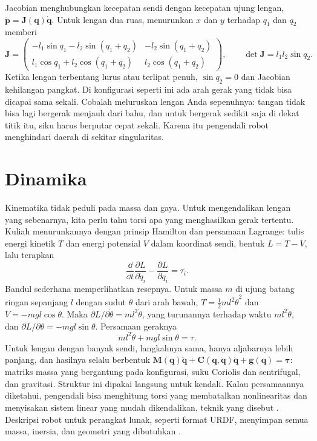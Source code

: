 Jacobian menghubungkan kecepatan sendi dengan kecepatan ujung lengan, $\dot{\bm p}=\bm J(\bm q)\dot{\bm q}$. Untuk
lengan dua ruas, menurunkan $x$ dan $y$ terhadap $q_1$ dan $q_2$ memberi
\begin{equation}
\bm J=\begin{pmatrix}-l_1\sin q_1-l_2\sin(q_1+q_2)&-l_2\sin(q_1+q_2)\\ l_1\cos q_1+l_2\cos(q_1+q_2)&l_2\cos(q_1+q_2)\end{pmatrix},
\qquad\det\bm J=l_1l_2\sin q_2.
\end{equation}
Ketika lengan terbentang lurus atau terlipat penuh, $\sin q_2=0$ dan Jacobian kehilangan pangkat. Di konfigurasi
 seperti ini ada arah gerak yang tidak bisa dicapai sama sekali. Cobalah meluruskan lengan Anda
sepenuhnya: tangan tidak bisa lagi bergerak menjauh dari bahu, dan untuk bergerak sedikit saja di dekat titik itu,
siku harus berputar cepat sekali. Karena itu pengendali robot menghindari daerah di sekitar singularitas.

\section{Dinamika}

Kinematika tidak peduli pada massa dan gaya. Untuk mengendalikan lengan yang sebenarnya, kita perlu tahu torsi apa
yang menghasilkan gerak tertentu. Kuliah menurunkannya dengan prinsip Hamilton dan persamaan Lagrange: tulis energi
kinetik $T$ dan energi potensial $V$ dalam koordinat sendi, bentuk $L=T-V$, lalu terapkan
\begin{equation}
\frac{\dd}{\dd t}\frac{\partial L}{\partial\dot q_i}-\frac{\partial L}{\partial q_i}=\tau_i.
\end{equation}
Bandul sederhana memperlihatkan resepnya. Untuk massa $m$ di ujung batang ringan sepanjang $l$ dengan sudut $\theta$
dari arah bawah, $T=\tfrac12ml^2\dot\theta^2$ dan $V=-mgl\cos\theta$. Maka $\partial L/\partial\dot\theta=ml^2\dot\theta$,
yang turunannya terhadap waktu $ml^2\ddot\theta$, dan $\partial L/\partial\theta=-mgl\sin\theta$. Persamaan geraknya
\begin{equation}
ml^2\ddot\theta+mgl\sin\theta=\tau.
\end{equation}
Untuk lengan dengan banyak sendi, langkahnya sama, hanya aljabarnya lebih panjang, dan hasilnya selalu berbentuk
$\bm M(\bm q)\ddot{\bm q}+\bm C(\bm q,\dot{\bm q})\dot{\bm q}+\bm g(\bm q)=\bm\tau$: matriks massa yang bergantung pada
konfigurasi, suku Coriolis dan sentrifugal, dan gravitasi. Struktur ini dipakai langsung untuk kendali. Kalau
persamaannya diketahui, pengendali bisa menghitung torsi yang membatalkan nonlinearitas dan menyisakan sistem linear
yang mudah dikendalikan, teknik yang disebut . Deskripsi robot untuk perangkat lunak, seperti format
URDF, menyimpan semua massa, inersia, dan geometri yang dibutuhkan \citep{lynch2017}.

